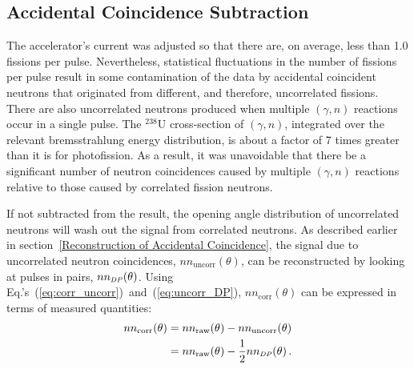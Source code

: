 \subsection{Accidental Coincidence Subtraction}
\label{accidental subtraction}
The accelerator's current was adjusted so that there are, on average, less than 1.0 fissions per pulse.
Nevertheless, statistical fluctuations in the number of fissions per pulse result in some contamination of the data by accidental coincident neutrons that originated from different, and therefore, uncorrelated fissions.
There are also uncorrelated neutrons produced when multiple $(\gamma, n)$ reactions occur in a single pulse.
The $^{238}$U cross-section of $(\gamma, n)$, integrated over the relevant bremsstrahlung energy distribution, is about a factor of 7 times greater than it is for photofission.
As a result, it was unavoidable that there be a significant number of neutron coincidences caused by multiple $(\gamma, n)$ reactions relative to those caused by correlated fission neutrons.

If not subtracted from the result, the opening angle distribution of uncorrelated neutrons will wash out the signal from correlated neutrons. 
As described earlier in section~\ref{Reconstruction of Accidental Coincidence}, the signal due to uncorrelated neutron coincidences, $nn_{\text{uncorr}}(\theta)$, can be reconstructed by looking at pulses in pairs, $nn_{\scaleto{DP}{4pt}}(\theta)$.
Using Eq.'s~(\ref{eq:corr_uncorr})~and~(\ref{eq:uncorr_DP}),  $nn_{\text{corr}}(\theta)$ can be expressed in terms of measured quantities:
\begin{equation} \label{math:SP}
    \begin{split}
    nn_{\text{corr}}(\theta) &=  nn_{\text{raw}}(\theta) - nn_{\text{uncorr}}(\theta) \\
    &= nn_{\text{raw}}(\theta) - \frac{1}{2}nn_{\scaleto{DP}{4pt}}(\theta) \, .
    \end{split}
\end{equation}

